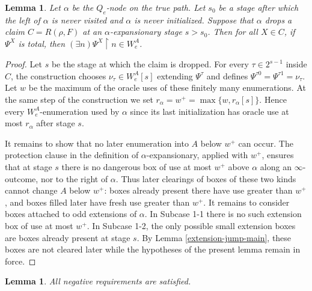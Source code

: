 \documentclass[11pt]{amsart}
\newtheorem{lemma}[theorem]{Lemma}
\begin{document}
\begin{lemma}\label{disposal-main}
Let $\alpha$ be the $Q_e$-node on the true path.  Let $s_0$ be a stage after
which the left of $\alpha$ is never visited and $\alpha$ is never initialized.
Suppose that $\alpha$ drops a claim $C=R(\rho,F)$ at an
$\alpha$-expansionary stage $s>s_0$.  Then for all $X \in C$, if $\Psi^X$ is total, then $(\exists n)\Psi^X\upharpoonright n\in W_e^A$.

\end{lemma}

\begin{proof}
Let $s$ be the stage at which the claim is dropped.  For every
$\tau\in2^{s-1}$ inside $C$, the construction chooses
$\nu_\tau\in W_e^A[s]$ extending $\Psi^\tau$ and defines
$\Psi^{\tau0}=\Psi^{\tau1}=\nu_\tau$.  Let $w$ be the maximum of the oracle
uses of these finitely many enumerations.
At the same step of the construction we set $r_\alpha=w^+=\max\{w,r_\alpha[s]\}$.  Hence every
$W_e^A$-enumeration used by $\alpha$ since its last initialization has oracle use
at most $r_\alpha$ after stage $s$.

It remains to show that no later enumeration into $A$ below $w^+$ can occur.  The
protection clause in the definition of $\alpha$-expansionary, applied with
$w^+$, ensures that at stage $s$ there is no dangerous box of use at most
$w^+$ above $\alpha$ along an $\infty$-outcome, nor to the right of $\alpha$.
Thus later clearings of boxes of these two kinds cannot change $A$ below
$w^+$: boxes already present there have use greater than $w^+$, and boxes filled
later have fresh use greater than $w^+$.
It remains to consider boxes attached to odd extensions of $\alpha$.  In
Subcase 1-1 there is no such extension box of use at most $w^+$. In Subcase 1-2, the only possible small extension boxes are boxes already
present at stage $s$.  By Lemma \ref{extension-jump-main}, these boxes are not
cleared later while the hypotheses of the present lemma remain in force. 
\end{proof}

\begin{lemma}\label{negative-main}
All negative requirements are satisfied.
\end{lemma}
\end{document}
